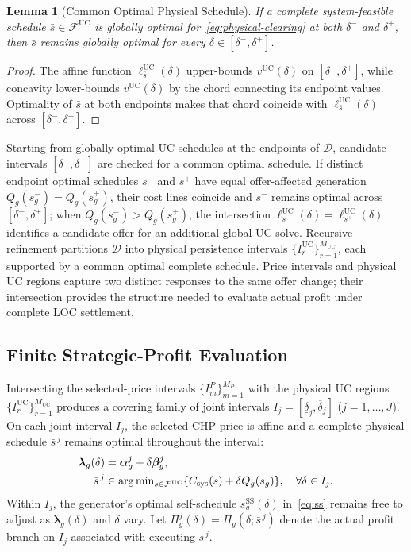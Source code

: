 \documentclass[journal]{IEEEtran}
\newtheorem{lemma}{Lemma}
\newcommand{\blambda}{\bm\lambda}
\newcommand{\UC}{\mathrm{UC}}
\newcommand{\SSched}{\mathrm{SS}}
\begin{document}
\begin{lemma}[Common Optimal Physical Schedule]
\label{lem:uc}
If a complete system-feasible schedule $\bar{s}\in\mathcal{F}^{\UC}$ is globally optimal for~\eqref{eq:physical-clearing} at both $\delta^-$ and $\delta^+$, then $\bar{s}$ remains globally optimal for every $\delta\in[\delta^-,\delta^+]$.
\end{lemma}

\begin{proof}
The affine function $\ell_{\bar{s}}^{\UC}(\delta)$ upper-bounds $v^{\UC}(\delta)$ on $[\delta^-,\delta^+]$, while concavity lower-bounds $v^{\UC}(\delta)$ by the chord connecting its endpoint values. Optimality of $\bar{s}$ at both endpoints makes that chord coincide with $\ell_{\bar{s}}^{\UC}(\delta)$ across $[\delta^-,\delta^+]$.
\end{proof}

Starting from globally optimal UC schedules at the endpoints of $\mathcal{D}$, candidate intervals $[\delta^-,\delta^+]$ are checked for a common optimal schedule. If distinct endpoint optimal schedules $s^-$ and $s^+$ have equal offer-affected generation $Q_g(s_g^-)=Q_g(s_g^+)$, their cost lines coincide and $s^-$ remains optimal across $[\delta^-,\delta^+]$; when $Q_g(s_g^-)>Q_g(s_g^+)$, the intersection $\ell_{s^-}^{\UC}(\delta)=\ell_{s^+}^{\UC}(\delta)$ identifies a candidate offer for an additional global UC solve. Recursive refinement partitions $\mathcal{D}$ into physical persistence intervals $\{I_r^{\UC}\}_{r=1}^{M_{\UC}}$, each supported by a common optimal complete schedule. Price intervals and physical UC regions capture two distinct responses to the same offer change; their intersection provides the structure needed to evaluate actual profit under complete LOC settlement.

\subsection{Finite Strategic-Profit Evaluation}
Intersecting the selected-price intervals $\{I_m^P\}_{m=1}^{M_P}$ with the physical UC regions $\{I_r^{\UC}\}_{r=1}^{M_{\UC}}$ produces a covering family of joint intervals $I_j=[\underline{\delta}_j,\overline{\delta}_j]$ ($j=1,\ldots,J$). On each joint interval $I_j$, the selected CHP price is affine and a complete physical schedule $\bar{s}^{\,j}$ remains optimal throughout the interval:
\begin{align}
\blambda_g(\delta) &= \bm{\alpha}_g^j + \delta\bm{\beta}_g^j,\notag\\
\bar{s}^{\,j} &\in \arg\min\nolimits_{s\in\mathcal{F}^{\UC}}\{C_{\mathrm{sys}}(s) + \delta Q_g(s_g)\}, \quad \forall\delta\in I_j.\label{eq:joint-region}
\end{align}
Within $I_j$, the generator's optimal self-schedule $s_g^{\SSched}(\delta)$ in~\eqref{eq:ss} remains free to adjust as $\blambda_g(\delta)$ and $\delta$ vary. Let $\Pi_g^j(\delta)=\Pi_g(\delta;\bar{s}^{\,j})$ denote the actual profit branch on $I_j$ associated with executing $\bar{s}^{\,j}$.
\end{document}
